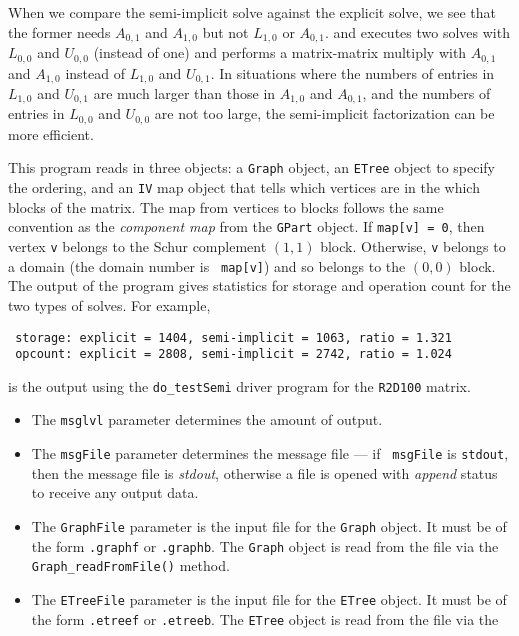 \begin{enumerate}
\begin{itemize}
\end{itemize}
When we compare the semi-implicit solve against the explicit solve,
we see that the former needs
$A_{0,1}$ and $A_{1,0}$ but not $L_{1,0}$ or $A_{0,1}$.
and executes two solves with $L_{0,0}$ and $U_{0,0}$ (instead of one)
and performs a matrix-matrix multiply with $A_{0,1}$ and $A_{1,0}$
instead of $L_{1,0}$ and $U_{0,1}$.
In situations where the numbers of entries in $L_{1,0}$ and
$U_{0,1}$ are much larger than those in $A_{1,0}$ and $A_{0,1}$,
and the numbers of entries in $L_{0,0}$ and $U_{0,0}$ are not too
large, the semi-implicit factorization can be more efficient.
\par
This program reads in three objects:
a {\tt Graph} object,
an {\tt ETree} object to specify the ordering,
and an {\tt IV} map object that tells which vertices are in the
which blocks of the matrix.
The map from vertices to blocks follows the same convention as the
{\it component map} from the {\tt GPart} object.
If {\tt map[v] = 0}, then vertex {\tt v} belongs to the Schur
complement $(1,1)$ block.
Otherwise, {\tt v} belongs to a domain (the domain number is {\tt
map[v]}) and so belongs to the $(0,0)$ block.
The output of the program gives statistics for storage and
operation count for the two types of solves.
For example,
\begin{verbatim}
 storage: explicit = 1404, semi-implicit = 1063, ratio = 1.321
 opcount: explicit = 2808, semi-implicit = 2742, ratio = 1.024
\end{verbatim}
is the output using the {\tt do\_testSemi} driver program for
the {\tt R2D100} matrix.
\par
\begin{itemize}
\item
The {\tt msglvl} parameter determines the amount of output.
\item
The {\tt msgFile} parameter determines the message file --- if {\tt
msgFile} is {\tt stdout}, then the message file is {\it stdout},
otherwise a file is opened with {\it append} status to receive any
output data.
\item
The {\tt GraphFile} parameter is the input file for the {\tt Graph}
object. It must be of the form {\tt *.graphf} or {\tt *.graphb}.
The {\tt Graph} object is read from the file via the
{\tt Graph\_readFromFile()} method.
\item
The {\tt ETreeFile} parameter is the input file for the {\tt ETree}
object. It must be of the form {\tt *.etreef} or {\tt *.etreeb}.
The {\tt ETree} object is read from the file via the

\end{itemize}
\end{enumerate}
